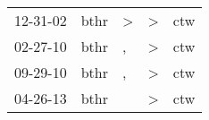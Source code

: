 \begin{supertabular}{p{0.07\textwidth}p{0.06\textwidth}p{0.02\textwidth}p{0.02\textwidth}p{0.06\textwidth}}
 12-31-02\textsuperscript{} &  bthr\textsuperscript{} &  \textgreater &  \textgreater &  ctw\textsuperscript{} \\
 02-27-10\textsuperscript{} &  bthr\textsuperscript{} &             , &  \textgreater &  ctw\textsuperscript{} \\
 09-29-10\textsuperscript{} &  bthr\textsuperscript{} &             , &  \textgreater &  ctw\textsuperscript{} \\
 04-26-13\textsuperscript{} &  bthr\textsuperscript{} &               &  \textgreater &  ctw\textsuperscript{} \\
\end{supertabular}
